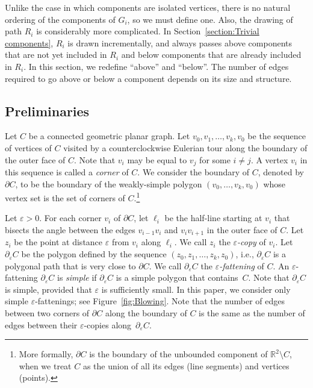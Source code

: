 \documentclass[11pt]{patmorin}
\begin{document}
Unlike the case in which
components are isolated vertices, there is no natural ordering of the
components of $G_i$, so we must define one. Also, the drawing
of path $R_i$ is considerably more complicated.  In Section~\ref{section:Trivial components}, $R_i$ is drawn incrementally, and always passes above components that are not yet included in $R_i$ and below components that are already included in $R_i$.  In this section, we redefine ``above'' and ``below''. The number of edges required to go above or below a component depends on its size and structure.

\subsection{Preliminaries}\label{section:Preliminaries} 
Let $C$ be a connected geometric planar graph. Let $v_0, v_1, \ldots, v_k, v_0$ be the sequence of vertices of $C$ visited by a counterclockwise
Eulerian tour along the boundary of the outer face of $C$. Note that
$v_i$ may be equal to $v_j$ for some $i\neq j$.  A vertex $v_i$
in this sequence is called a \emph{corner} of $C$.  We consider the boundary of $C$, denoted by $\partial C$, to be the
boundary of the weakly-simple polygon $(v_0, \ldots, v_k, v_0)$ whose
vertex set is the set of corners of $C$.\footnote{More formally, $\partial C$ is the boundary of the unbounded component of $\mathbb{R}^2\setminus C$, when we treat $C$ as the union of all its edges (line segments) and vertices (points).}

Let $\varepsilon >0$. For each corner $v_i$ of $\partial C$, let $\ell_i$ be the half-line starting at $v_i$ that bisects the angle between the edges $v_{i-1}v_i$ and $v_i v_{i+1}$ in the outer face of $C$. Let $z_i$ be the point at distance $\varepsilon$ from $v_i$ along $\ell_i$. We call $z_i$ the \emph{$\varepsilon$-copy} of $v_i$. Let $\partial_\varepsilon C$ be the polygon defined by the sequence $(z_0, z_1, \ldots, z_k, z_0)$, i.e., $\partial_\varepsilon C$ is a polygonal path that is very close to $\partial C$. We call $\partial_\varepsilon C$ the \emph{$\varepsilon$-fattening} of $C$.
An $\varepsilon$-fattening $\partial_\varepsilon C$ is \emph{simple} if $\partial_\varepsilon C$  is a simple polygon that contains~$C$.
Note that $\partial_\varepsilon C$ is simple, provided that $\varepsilon$ is sufficiently small. In this paper, we consider only simple $\varepsilon$-fattenings; see Figure~\ref{fig:Blowing}. Note that the number of edges between two corners of $\partial C$ along the boundary of $C$ is the same as the number of edges between their $\varepsilon$-copies along~$\partial_\varepsilon C$.
\end{document}
